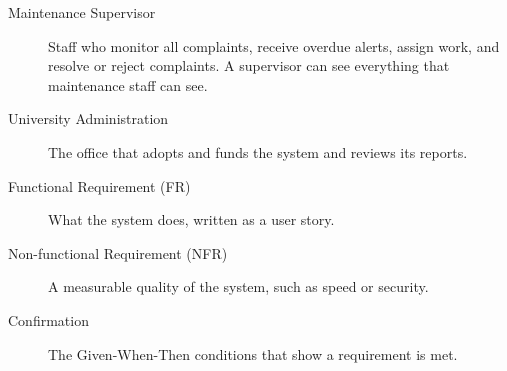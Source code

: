\begin{appendices}
\begin{description}
  \item[Maintenance Supervisor] Staff who monitor all complaints, receive overdue alerts, assign work, and resolve or reject complaints. A supervisor can see everything that maintenance staff can see.
  \item[University Administration] The office that adopts and funds the system and reviews its reports.
  \item[Functional Requirement (FR)] What the system does, written as a user story.
  \item[Non-functional Requirement (NFR)] A measurable quality of the system, such as speed or security.
  \item[Confirmation] The Given-When-Then conditions that show a requirement is met.
\end{description}
\end{appendices}